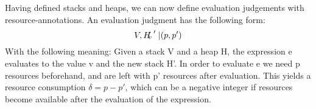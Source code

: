 Having defined stacks and heaps, we can now define evaluation judgements with resource-annotations. An evaluation judgment has the following form:
$$ V, H \turnstile e \rightsquigarrow v, H' | (p, p') $$
With the following meaning: Given a stack V and a heap H, the expression e evaluates to the value v and the new stack H'. In order to evaluate e we need p resources beforehand, and are left with p' resources after evaluation. This yields a resource consumption $\delta = p - p'$, which can be a negative integer if resources become available after the evaluation of the expression.


